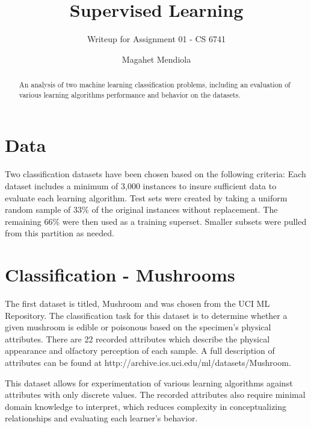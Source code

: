 \documentclass{sig-alternate}
\begin{document}
\title{Supervised Learning}
\subtitle{Writeup for Assignment 01 - CS 6741}

\author{
\alignauthor
Magahet Mendiola
}
\date{}

\maketitle
\begin{abstract}
An analysis of two machine learning classification problems, including an evaluation of various learning algorithms performance and behavior on the datasets.
\end{abstract}
 


\section{Data}

Two classification datasets have been chosen based on the following criteria: Each dataset includes a minimum of 3,000 instances to insure sufficient data to evaluate each learning algorithm. Test sets were created by taking a uniform random sample of 33\% of the original instances without replacement. The remaining 66\% were then used as a training superset. Smaller subsets were pulled from this partition as needed.


\section{Classification - Mushrooms}

The first dataset is titled, Mushroom \cite{Bache+Lichman:2013} and was chosen from the UCI ML Repository. The classification task for this dataset is to determine whether a given mushroom is edible or poisonous based on the specimen's physical attributes. There are 22 recorded attributes which describe the physical appearance and olfactory perception of each sample. A full description of attributes can be found at http://archive.ics.uci.edu/ml/datasets/Mushroom.

This dataset allows for experimentation of various learning algorithms against attributes with only discrete values. The recorded attributes also require minimal domain knowledge to interpret, which reduces complexity in conceptualizing relationships and evaluating each learner's behavior.
\end{document}
